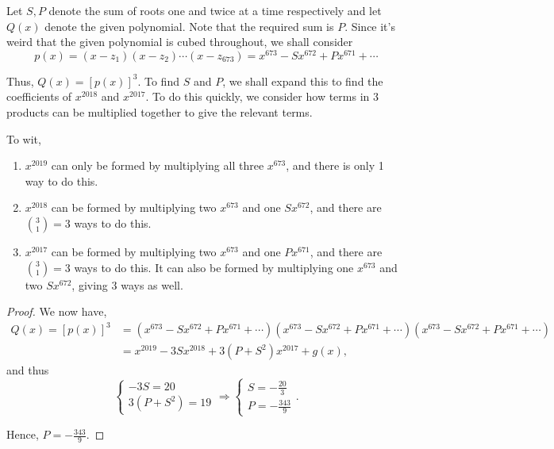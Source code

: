 \documentclass[../jarvis.tex]{subfiles}
\begin{document}
Let $S, P$ denote the sum of roots one and twice at a time respectively and let $Q(x)$ denote the given polynomial. Note that the required sum is $P$. Since it's weird that the given polynomial is cubed throughout, we shall consider
$$p(x)=(x-z_1)(x-z_2)\cdots(x-z_{673})=x^{673}-Sx^{672}+Px^{671}+\cdots$$

Thus, $Q(x)=[p(x)]^3$. To find $S$ and $P$, we shall expand this to find the coefficients of $x^{2018}$ and $x^{2017}$. To do this quickly, we consider how terms in 3 products can be multiplied together to give the relevant terms.

To wit, 
\begin{enumerate}
    \item $x^{2019}$ can only be formed by multiplying all three $x^{673}$, and there is only 1 way to do this.
    \item $x^{2018}$ can be formed by multiplying two $x^{673}$ and one $Sx^{672}$, and there are $\binom{3}{1}=3$ ways to do this.
    \item $x^{2017}$ can be formed by multiplying two $x^{673}$ and one $Px^{671}$, and there are $\binom{3}{1}=3$ ways to do this. It can also be formed by multiplying one $x^{673}$ and two $Sx^{672}$, giving $3$ ways as well.
\end{enumerate}
\begin{proof}
    We now have,
\begin{align*}
    Q(x)=[p(x)]^3&=(x^{673}-Sx^{672}+Px^{671}+\cdots)(x^{673}-Sx^{672}+Px^{671}+\cdots)(x^{673}-Sx^{672}+Px^{671}+\cdots) \\
    &= x^{2019}-3Sx^{2018}+3(P+S^2)x^{2017}+g(x),
\end{align*}
and thus
$$\begin{cases} -3S=20 \\ 3(P+S^2)=19 \end{cases}\Rightarrow \begin{cases} S=-\frac{20}{3} \\ P=-\frac{343}{9}\end{cases}.$$

Hence, $\boxed{P=-\frac{343}{9}}$.
\end{proof}
\end{document}
